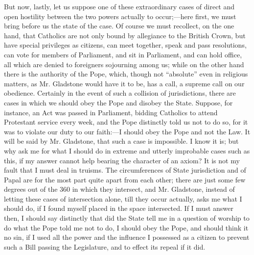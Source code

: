 But now, lastly, let us suppose one of these extraordinary cases of
direct and open hostility between the two powers actually to
occur;—here first, we must bring before us the state of the case. Of
course we must recollect, on the one hand, that Catholics are not only
bound by allegiance to the British Crown, but have special privileges as
citizens, can meet together, speak and pass resolutions, can vote for
members of Parliament, and sit in Parliament, and can hold office, all
which are denied to foreigners sojourning among us; while on the other
hand there is the authority of the Pope, which, though not
``absolute'' even in religious matters, as Mr. Gladstone would
have it to be, has a call, a supreme call on our obedience. Certainly in
the event of such a collision of jurisdictions, there are cases in which
we should obey the Pope and disobey the State. Suppose, for instance, an
Act was passed in Parliament, bidding Catholics to attend Protestant
service every week, and the Pope distinctly told us not to do so, for it
was to violate our duty to our faith:—I should obey the Pope and not
the Law. It will be said by Mr. Gladstone, that such a case is
impossible. I know it is; but why ask me for what I should do in extreme
and utterly improbable cases such as this, if my answer cannot help
bearing the character of an axiom? It is not my fault that I must deal
in truisms. The circumferences of State jurisdiction and of Papal are
for the most part quite apart from each other; there are just some few
degrees out of the 360 in which they intersect, and Mr. Gladstone,
instead of letting these cases of intersection alone, till they occur
actually, asks me what I should do, if I found myself placed in the
space intersected. If I must answer then, I should say distinctly that
did the State tell me in a question of worship to do what the Pope
told me not to do, I should obey the Pope, and should think it no sin,
if I used all the power and the influence I possessed as a citizen to
prevent such a Bill passing the Legislature, and to effect its repeal if
it did.


